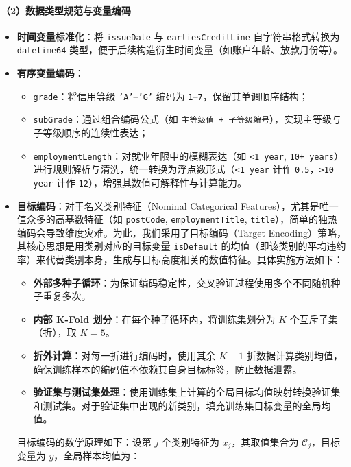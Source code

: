 \documentclass{thuemp}
\begin{document}
\paragraph{（2）数据类型规范与变量编码}
\begin{itemize}
    \item \textbf{时间变量标准化}：将 \texttt{issueDate} 与 \texttt{earliesCreditLine} 自字符串格式转换为 \texttt{datetime64} 类型，便于后续构造衍生时间变量（如账户年龄、放款月份等）。
    \item \textbf{有序变量编码}：
    \begin{itemize}
        \item \texttt{grade}：将信用等级 \texttt{'A'}--\texttt{'G'} 编码为 \texttt{1}--\texttt{7}，保留其单调顺序结构；
        \item \texttt{subGrade}：通过组合编码公式（如 \texttt{主等级值  + 子等级编号}），实现主等级与子等级顺序的连续性表达；
        \item \texttt{employmentLength}：对就业年限中的模糊表达（如 \texttt{<1 year}, \texttt{10+ years}）进行规则解析与清洗，统一转换为浮点数形式（\texttt{<1 year} 计作 \texttt{0.5}，\texttt{>10 year} 计作 \texttt{12}），增强其数值可解释性与计算能力。
    \end{itemize}
    \item \textbf{目标编码}：对于名义类别特征（Nominal Categorical Features），尤其是唯一值众多的高基数特征（如 \texttt{postCode}, \texttt{employmentTitle}, \texttt{title}），简单的独热编码会导致维度灾难。为此，我们采用了目标编码（Target Encoding）策略，其核心思想是用类别对应的目标变量 \texttt{isDefault} 的均值（即该类别的平均违约率）来代替类别本身，生成与目标高度相关的数值特征。具体实施方法如下：
    \begin{itemize}
        \item \textbf{外部多种子循环}：为保证编码稳定性，交叉验证过程使用多个不同随机种子重复多次。
        \item \textbf{内部 K-Fold 划分}：在每个种子循环内，将训练集划分为 $K$ 个互斥子集（折），取 $K=5$。
        \item \textbf{折外计算}：对每一折进行编码时，使用其余 $K-1$ 折数据计算类别均值，确保训练样本的编码值不依赖其自身目标标签，防止数据泄露。
        \item \textbf{验证集与测试集处理}：使用训练集上计算的全局目标均值映射转换验证集和测试集。对于验证集中出现的新类别，填充训练集目标变量的全局均值。
    \end{itemize}
    目标编码的数学原理如下：设第 $j$ 个类别特征为 $x_j$，其取值集合为 $\mathcal{C}_j$，目标变量为 $y$，全局样本均值为：

\end{itemize}
\end{document}
